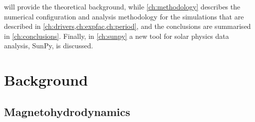 \documentclass[a4paper,12pt,fourier,authoryear,custommargin]{Classes/PhDThesisPSnPDF}
\begin{document}
 will provide the theoretical background, while \cref{ch:methodology} describes the numerical configuration and analysis methodology for the simulations that are described in \cref{ch:drivers,ch:expfac,ch:period}, and the conclusions are summarised in \cref{ch:conclusions}.
Finally, in \cref{ch:sunpy} a new tool for solar physics data analysis, SunPy, is discussed.
\clearpage{}%
%

%
\clearpage{}%

\chapter{Background}\label{ch:background}  %

	

\section{Magnetohydrodynamics}\label{sec:MHD}
\end{document}
